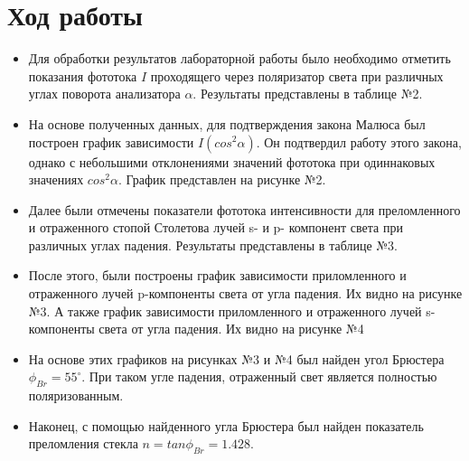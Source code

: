 \documentclass{article}
\begin{document}
\section{Ход работы}
\begin{itemize}
  \item Для обработки результатов лабораторной работы было необходимо отметить показания фототока $I$ проходящего через поляризатор света при различных углах поворота анализатора $\alpha$. Результаты представлены в таблице №2.
  \item На основе полученных данных, для подтверждения закона Малюса был построен график зависимости $I(cos^2\alpha)$. Он подтвердил работу этого закона, однако с небольшими отклонениями значений фототока при одиннаковых значениях $cos^2\alpha$. График представлен на рисунке №2.
  \item Далее были отмечены показатели фототока интенсивности для преломленного и отраженного стопой Столетова лучей s- и p- компонент света при различных углах падения. Результаты представлены в таблице №3.
  \item После этого, были построены график зависимости приломленного и отраженного лучей p-компоненты света от угла падения. Их видно на рисунке №3. А также график зависимости приломленного и отраженного лучей s-компоненты света от угла падения. Их видно на рисунке №4
  \item На основе этих графиков на рисунках №3 и №4 был найден угол Брюстера $\phi_{Br} = 55^\circ$. При таком угле падения, отраженный свет является полностью поляризованным.
  \item Наконец, с помощью найденного угла Брюстера был найден показатель преломления стекла $n = tan\phi_{Br}=1.428$.
\end{itemize}
\newpage
\end{document}

